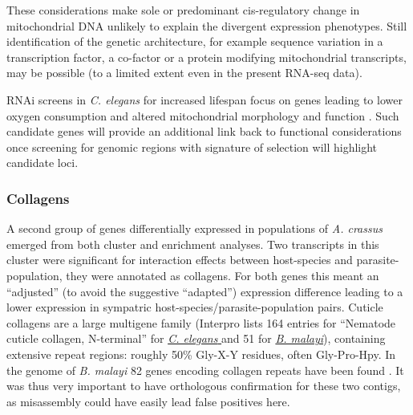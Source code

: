 These considerations make sole or predominant cis-regulatory change in
mitochondrial DNA unlikely to explain the divergent expression
phenotypes. Still identification of the genetic architecture, for
example sequence variation in a transcription factor, a co-factor or a
protein modifying mitochondrial transcripts, may be possible (to a
limited extent even in the present RNA-seq data).

RNAi screens in \textit{C. elegans} for increased lifespan focus on
genes leading to lower oxygen consumption and altered mitochondrial
morphology and function \cite{pmid12447374}. Such candidate genes will
provide an additional link back to functional considerations once
screening for genomic regions with signature of selection will
highlight candidate loci.




\subsubsection{Collagens}
\label{sec:collagens}

A second group of genes differentially expressed in populations of
\textit{A. crassus} emerged from both cluster and enrichment
analyses. Two transcripts in this cluster were significant for
interaction effects between host-species and parasite-population, they
were annotated as collagens. For both genes this meant an ``adjusted''
(to avoid the suggestive ``adapted'') expression difference leading to
a lower expression in sympatric host-species/parasite-population
pairs. Cuticle collagens are a large multigene family (Interpro lists
164 entries for ``Nematode cuticle collagen, N-terminal'' for
\href{http://www.ebi.ac.uk/interpro/ISpy?ipr=IPR002486&tax=6239}{\textit{C. elegans}
} and 51 for
\href{http://www.ebi.ac.uk/interpro/ISpy?ipr=IPR002486&tax=6279}{\textit{B. malayi}}),
containing extensive repeat regions: roughly 50\% Gly-X-Y residues,
often Gly-Pro-Hpy. In the genome of \textit{B. malayi} 82 genes
encoding collagen repeats have been found \cite{ghedin_draft_2007}. It
was thus very important to have orthologous confirmation for these two
contigs, as misassembly could have easily lead false positives here.

